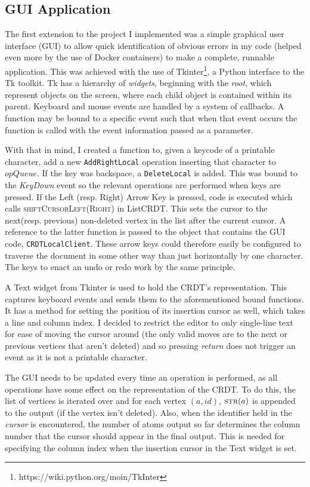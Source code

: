 \documentclass[diss.tex]{subfiles}
\begin{document}
\subsection{GUI Application}
The first extension to the project I implemented was a simple graphical user interface (GUI) to allow quick identification of obvious errors in my code (helped even more by the use of Docker containers) to make a complete, runnable application. This was achieved with the use of Tkinter\footnote{https://wiki.python.org/moin/TkInter}, a Python interface to the Tk toolkit. Tk has a hierarchy of \textit{widgets}, beginning with the \textit{root}, which represent objects on the screen, where each child object is contained within its parent. Keyboard and mouse events are handled by a system of callbacks. A function may be bound to a specific event such that when that event occurs the function is called with the event information passed as a parameter.

With that in mind, I created a function to, given a keycode of a printable character, add a new \texttt{AddRightLocal} operation inserting that character to $opQueue$.  If the key was backspace, a \texttt{DeleteLocal} is added. This was bound to the \textit{KeyDown} event so the relevant operations are performed when keys are pressed. If the Left (resp. Right) Arrow Key is pressed, code is executed which calls \textsc{shiftCursorLeft(Right)} in ListCRDT. This sets the cursor to the next(resp. previous) non-deleted vertex in the list after the current cursor. A reference to the latter function is passed to the object that contains the GUI code, \texttt{CRDTLocalClient}. These arrow keys could therefore easily be configured to traverse the document in some other way than just horizontally by one character. The keys to enact an undo or redo work by the same principle.

A Text widget from Tkinter is used to hold the CRDT's representation. This captures keyboard events and sends them to the aforementioned bound functions. It has a method for setting the position of its insertion cursor as well, which takes a line and column index. I decided to restrict the editor to only single-line text for ease of moving the cursor around (the only valid moves are to the next or previous vertices that aren't deleted) and so pressing \textit{return} does not trigger an event as it is not a printable character.

The GUI needs to be updated every time an operation is performed, as all operations have some effect on the representation of the CRDT. To do this, the list of vertices is iterated over and for each vertex $(a,id)$, $\textsc{str}(a)$ is appended to the output (if the vertex isn't deleted). Also, when the identifier held in the \textit{cursor} is encountered, the number of atoms output so far determines the column number that the cursor should appear in the final output. This is needed for specifying the column index when the insertion cursor in the Text widget is set.
\end{document}
